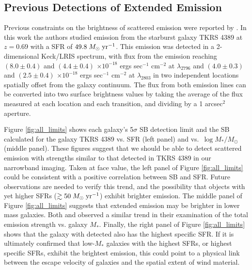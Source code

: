 \documentclass[twocolumn]{aastex62}
\def \msunperyr {{\; M_{\odot}\rm \;yr^{-1}}}
\begin{document}
\subsection{Previous Detections of Extended  Emission}
Previous constraints on the brightness of scattered  emission were reported by \cite{Rubin_2011}. In this work the authors studied emission from the starburst galaxy TKRS 4389 at $z = 0.69$ with a SFR of $49.8\msunperyr$. This emission was detected in a 2-dimensional Keck/LRIS spectrum, with flux from the emission reaching $(8.0 \pm 0.4)$ and $(4.4 \pm 0.4)$ $\times10^{-18}$ ergs sec$^{-1}$ cm$^{-2}$ at  $\lambda _{2796}$ and $(4.0 \pm 0.3)$ and $(2.5 \pm 0.4)$ $\times10^{-18}$ ergs sec$^{-1}$ cm$^{-2}$ at $\lambda_{2803}$ in two independent locations spatially offset from the galaxy continuum. The flux from both emission lines can be converted into two surface brightness values by taking the average of the flux measured at each location and each transition, and dividing by a 1 arcsec$^2$ aperture. 

Figure \ref{fig:all_limits} shows each galaxy's 5$\sigma$ SB detection limit and the SB calculated for the galaxy TKRS 4389 vs. SFR (left panel) and vs.\ $\log M_*/M_{\odot}$ (middle panel). These figures suggest that we should be able to detect scattered  emission with strengths similar to that detected in TKRS 4389 in our narrowband imaging. Taken at face value, the left panel of Figure \ref{fig:all_limits} could be consistent with a positive correlation between  SB and SFR. Future observations are needed to verify this trend, and the possibility that objects with yet higher SFRs ($\gtrsim50 \msunperyr$) exhibit brighter  emission. The middle panel of Figure \ref{fig:all_limits} suggests that extended  emission may be brighter in lower mass galaxies. Both \cite{Erb2012} and \cite{Feltre2018} observed a similar trend in their examination of the total  emission strength vs. galaxy $M_*$. %
Finally, the right panel of Figure \ref{fig:all_limits}
shows that the galaxy with detected  also has the highest specific SFR. If it is ultimately confirmed that low-$M_*$ galaxies with the highest SFRs, or highest specific SFRs, exhibit the brightest emission, this could point to a physical link between the escape velocity of galaxies and the spatial extent of wind material. 
\end{document}
